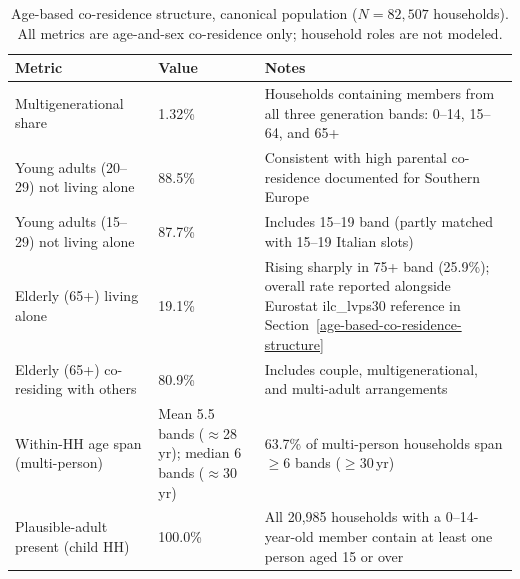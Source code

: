 \documentclass{article}
\begin{document}
\begin{landscape}
\begin{table}[htbp]
\centering
\caption{Age-based co-residence structure, canonical population ($N=82{,}507$ households).
All metrics are age-and-sex co-residence only; household roles are not modeled.}
\label{tab:coresidence_metrics}
\small
\begin{tabular}{p{5.5cm}p{5.5cm}p{10cm}}
\toprule
Metric & Value & Notes \\
\midrule
Multigenerational share & 1.32\% & Households containing members from all three generation bands: 0--14, 15--64, and 65+ \\
Young adults (20--29) not living alone & 88.5\% & Consistent with high parental co-residence documented for Southern Europe \\
Young adults (15--29) not living alone & 87.7\% & Includes 15--19 band (partly matched with 15--19 Italian slots) \\
Elderly (65+) living alone & 19.1\% & Rising sharply in 75+ band (25.9\%); overall rate reported alongside Eurostat ilc\_lvps30 reference in Section~\ref{age-based-co-residence-structure} \\
Elderly (65+) co-residing with others & 80.9\% & Includes couple, multigenerational, and multi-adult arrangements \\
Within-HH age span (multi-person) & Mean 5.5 bands ($\approx$28\,yr); median 6 bands ($\approx$30\,yr) & 63.7\% of multi-person households span $\geq$6 bands ($\geq$30\,yr) \\
Plausible-adult present (child HH) & 100.0\% & All 20{,}985 households with a 0--14-year-old member contain at least one person aged 15 or over \\
\bottomrule
\end{tabular}
\end{table}
\end{landscape}
\end{document}
